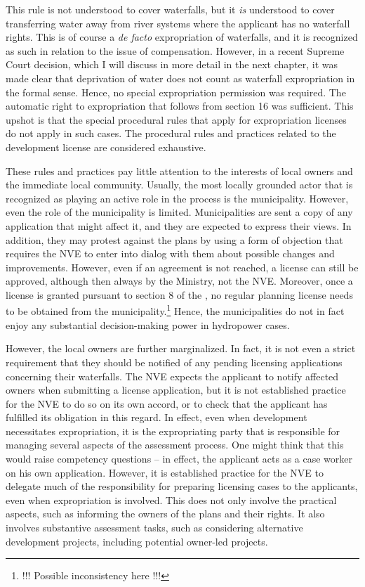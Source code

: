 This rule is not understood to cover waterfalls, but it {\it is} understood to cover transferring water away from river systems where the applicant has no waterfall rights. This is of course a {\it de facto} expropriation of waterfalls, and it is recognized as such in relation to the issue of compensation. However, in a recent Supreme Court decision, which I will discuss in more detail in the next chapter, it was made clear that deprivation of water does not count as waterfall expropriation in the formal sense. Hence, no special expropriation permission was required. The automatic right to expropriation that follows from section 16 was sufficient. This upshot is that the special procedural rules that apply for expropriation licenses do not apply in such cases. The procedural rules and practices related to the development license are considered exhaustive.

These rules and practices pay little attention to the interests of local owners and the immediate local community. Usually, the most locally grounded actor that is recognized as playing an active role in the process is the municipality. However, even the role of the municipality is limited. Municipalities are sent a copy of any application that might affect it, and they are expected to express their views. In addition, they may protest against the plans by using a form of objection that requires the NVE to enter into dialog with them about possible changes and improvements. However, even if an agreement is not reached, a license can still be approved, although then always by the Ministry, not the NVE. Moreover, once a license is granted pursuant to section 8 of the \cite{wra00}, no regular planning license needs to be obtained from the municipality.\footnote{!!! Possible inconsistency here !!!} Hence, the municipalities do not in fact enjoy any substantial decision-making power in hydropower cases.

However, the local owners are further marginalized. In fact, it is not even a strict requirement that they should be notified of any pending licensing applications concerning their waterfalls. The NVE expects the applicant to notify affected owners when submitting a license application, but it is not established practice for the NVE to do so on its own accord, or to check that the applicant has fulfilled its obligation in this regard. In effect, even when development necessitates expropriation, it is the expropriating party that is responsible for managing several aspects of the assessment process. One might think that this would raise competency questions -- in effect, the applicant acts as a case worker on his own application. However, it is established practice for the NVE to delegate much of the responsibility for preparing licensing cases to the applicants, even when expropriation is involved. This does not only involve the practical aspects, such as informing the owners of the plans and their rights. It also involves substantive assessment tasks, such as considering alternative development projects, including potential owner-led projects.

